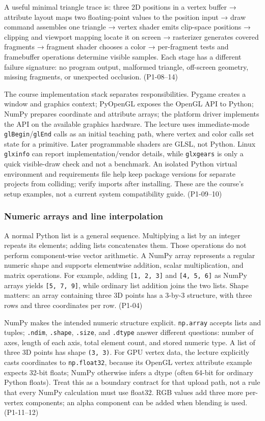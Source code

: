 A useful minimal triangle trace is: three 2D positions in a vertex buffer → attribute layout maps two floating-point values to the position input → draw command assembles one triangle → vertex shader emits clip-space positions → clipping and viewport mapping locate it on screen → rasterizer generates covered fragments → fragment shader chooses a color → per-fragment tests and framebuffer operations determine visible samples. Each stage has a different failure signature: no program output, malformed triangle, off-screen geometry, missing fragments, or unexpected occlusion. (P1-08--14)

The course implementation stack separates responsibilities. Pygame creates a window and graphics context; PyOpenGL exposes the OpenGL API to Python; NumPy prepares coordinate and attribute arrays; the platform driver implements the API on the available graphics hardware. The lecture uses immediate-mode \texttt{glBegin}/\texttt{glEnd} calls as an initial teaching path, where vertex and color calls set state for a primitive. Later programmable shaders are GLSL, not Python. Linux \texttt{glxinfo} can report implementation/vendor details, while \texttt{glxgears} is only a quick visible-draw check and not a benchmark. An isolated Python virtual environment and requirements file help keep package versions for separate projects from colliding; verify imports after installing. These are the course's setup examples, not a current system compatibility guide. (P1-09--10)

\subsubsection{Numeric arrays and line interpolation}\label{03-visual-computing-i-ch018-numeric-arrays-and-line-interpolation}

A normal Python list is a general sequence. Multiplying a list by an integer repeats its elements; adding lists concatenates them. Those operations do not perform component-wise vector arithmetic. A NumPy array represents a regular numeric shape and supports elementwise addition, scalar multiplication, and matrix operations. For example, adding \texttt{{[}1,\ 2,\ 3{]}} and \texttt{{[}4,\ 5,\ 6{]}} as NumPy arrays yields \texttt{{[}5,\ 7,\ 9{]}}, while ordinary list addition joins the two lists. Shape matters: an array containing three 3D points has a 3-by-3 structure, with three rows and three coordinates per row. (P1-04)

NumPy makes the intended numeric structure explicit. \texttt{np.array} accepts lists and tuples; \texttt{.ndim}, \texttt{.shape}, \texttt{.size}, and \texttt{.dtype} answer different questions: number of axes, length of each axis, total element count, and stored numeric type. A list of three 3D points has shape \texttt{(3,\ 3)}. For GPU vertex data, the lecture explicitly casts coordinates to \texttt{np.float32}, because its OpenGL vertex attribute example expects 32-bit floats; NumPy otherwise infers a dtype (often 64-bit for ordinary Python floats). Treat this as a boundary contract for that upload path, not a rule that every NumPy calculation must use float32. RGB values add three more per-vertex components; an alpha component can be added when blending is used. (P1-11--12)

